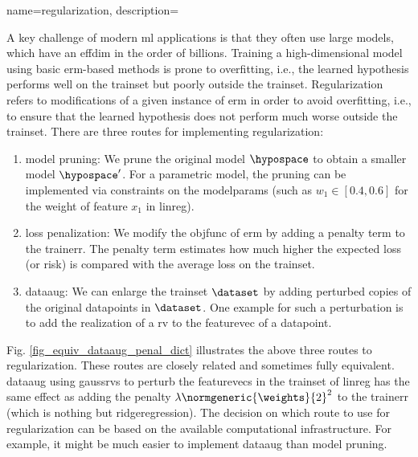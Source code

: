 {name={regularization}, 
	description={A key challenge of modern \gls{ml} applications is that they often 
		use large \glspl{model}, which have an \gls{effdim} in the order of billions. 
		Training a high-dimensional \gls{model} using basic \gls{erm}-based methods
		is prone to \gls{overfitting}, i.e., the learned \gls{hypothesis} performs well on the \gls{trainset} 
		but poorly outside the \gls{trainset}. Regularization refers to modifications of a given instance 
		of \gls{erm} in order to avoid \gls{overfitting}, i.e., to ensure that the learned \gls{hypothesis} does 
		not perform much worse outside the \gls{trainset}. There are three routes for implementing 
		regularization: 
		\begin{enumerate}[label=\arabic*)]
			\item {\Gls{model} pruning:} We prune the original \gls{model} $\hypospace$ to obtain a 
			smaller \gls{model} $\hypospace'$. For a parametric \gls{model}, the pruning can be 
			implemented via constraints on the \glspl{modelparam} (such as $w_{1} \in [0.4,0.6]$ for 
			the weight of \gls{feature} $x_{1}$ in \gls{linreg}).
			\item {\Gls{loss} penalization:} We modify the \gls{objfunc} of \gls{erm} by adding a 
			penalty term to the \gls{trainerr}. The penalty term estimates how much higher the expected \gls{loss} (or \gls{risk}) 
			is compared with the average \gls{loss} on the \gls{trainset}. 
			\item {\Gls{dataaug}:} We can enlarge the \gls{trainset} $\dataset$ by adding 
			perturbed copies of the original \glspl{datapoint} in $\dataset$. One example for such 
			a perturbation is to add the \gls{realization} of a \gls{rv} to the \gls{featurevec} 
			of a \gls{datapoint}. 
		\end{enumerate} 
		Fig. \ref{fig_equiv_dataaug_penal_dict} illustrates the above three routes to regularization. 
		These routes are closely related and sometimes fully equivalent. \Gls{dataaug} using \glspl{gaussrv} 
		to perturb the \glspl{featurevec} in the \gls{trainset} of \gls{linreg} 
		has the same effect as adding the penalty 
		$\lambda \normgeneric{\weights}{2}^2$ to the \gls{trainerr} (which is nothing but \gls{ridgeregression}). 
        		The decision on which route to use for regularization can be based on the 
        		available computational infrastructure. For example, it might be much easier to 
        		implement \gls{dataaug} than \gls{model} pruning. 
		\begin{figure}[H]

\end{figure}}}
